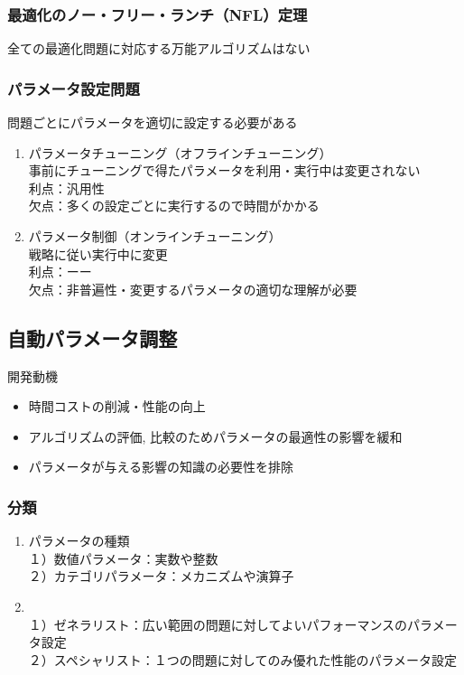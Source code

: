 \documentclass[twocolumn]{jarticle}     %
\begin{document}
\subsubsection{最適化のノー・フリー・ランチ（NFL）定理}
全ての最適化問題に対応する万能アルゴリズムはない

\subsubsection{パラメータ設定問題}
問題ごとにパラメータを適切に設定する必要がある

\begin{enumerate}
  \item パラメータチューニング（オフラインチューニング） \\
  事前にチューニングで得たパラメータを利用・実行中は変更されない\\
  利点：汎用性\\
  欠点：多くの設定ごとに実行するので時間がかかる

  \item パラメータ制御（オンラインチューニング） \\
  戦略に従い実行中に変更\\
  利点：ーー\\
  欠点：非普遍性・変更するパラメータの適切な理解が必要
\end{enumerate}


\subsection{自動パラメータ調整}

開発動機
\begin{itemize}
  \item 時間コストの削減・性能の向上
  \item アルゴリズムの評価, 比較のためパラメータの最適性の影響を緩和
  \item パラメータが与える影響の知識の必要性を排除
\end{itemize}

\subsubsection{分類}

\begin{enumerate}
  \item パラメータの種類 \\
  １）数値パラメータ：実数や整数\\
  ２）カテゴリパラメータ：メカニズムや演算子

  \item  \\
  １）ゼネラリスト：広い範囲の問題に対してよいパフォーマンスのパラメータ設定\\
  ２）スペシャリスト：１つの問題に対してのみ優れた性能のパラメータ設定

\end{enumerate}
\end{document}
